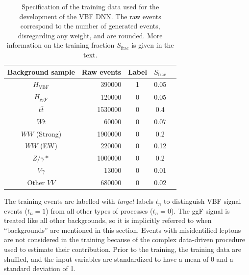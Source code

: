\begin{table}[ht]
    \centering
    \small
    \begin{tabular}{ c  | r c c c}
        \toprule
        Background sample  & Raw events & Label & $S_\text{frac}$ \\
        \midrule
        $H_{\mathrm{VBF}}$ & 390000     & 1     & 0.05            \\
        $H_{\mathrm{ggF}}$ & 120000     & 0     & 0.05            \\
        $t\bar{t}$         & 1530000    & 0     & 0.4             \\
        $Wt$               & 60000      & 0     & 0.07            \\
        $WW$ (Strong)      & 1900000    & 0     & 0.2             \\
        $WW$ (EW)          & 220000     & 0     & 0.12            \\
        $Z/\gamma*$        & 1000000    & 0     & 0.2             \\
        $V\gamma$          & 13000      & 0     & 0.01            \\
        Other $VV$         & 680000     & 0     & 0.02            \\
        \bottomrule
    \end{tabular}
    \caption{Specification of the training data used for the development of the VBF DNN. The raw events correspond to the number of generated events, disregarding any weight, and are rounded. More information on the training fraction $S_\text{frac}$ is given in the text.}
    \label{tab:DNNtrainingstats}
\end{table}
The training events are labelled with \emph{target} labels $t_n$ to distinguish VBF signal events ($t_n = 1$) from all other types of processes ($t_n = 0$).
The ggF signal is treated like all other backgrounds, so it is implicitly referred to when ``backgrounds'' are mentioned in this section.
Events with misidentified leptons are not considered in the training because of the complex data-driven procedure used to estimate their contribution.
Prior to the training, the training data are shuffled, and the input variables are standardized to have a mean of 0 and a standard deviation of 1.

